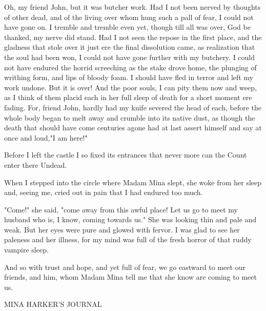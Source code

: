 Oh, my friend John, but it was butcher work. Had I not been nerved by thoughts of other dead, and of the living over whom hung such a pall of fear, I could not have gone on. I tremble and tremble even yet, though till all was over, God be thanked, my nerve did stand. Had I not seen the repose in the first place, and the gladness that stole over it just ere the final dissolution came, as realization that the soul had been won, I could not have gone further with my butchery. I could not have endured the horrid screeching as the stake drove home, the plunging of writhing form, and lips of bloody foam. I should have fled in terror and left my work undone. But it is over! And the poor souls, I can pity them now and weep, as I think of them placid each in her full sleep of death for a short moment ere fading. For, friend John, hardly had my knife severed the head of each, before the whole body began to melt away and crumble into its native dust, as though the death that should have come centuries agone had at last assert himself and say at once and loud,"I am here!" 

Before I left the castle I so fixed its entrances that never more can the Count enter there Undead. 

When I stepped into the circle where Madam Mina slept, she woke from her sleep and, seeing me, cried out in pain that I had endured too much. 

"Come!" she said, "come away from this awful place! Let us go to meet my husband who is, I know, coming towards us." She was looking thin and pale and weak. But her eyes were pure and glowed with fervor. I was glad to see her paleness and her illness, for my mind was full of the fresh horror of that ruddy vampire sleep. 

And so with trust and hope, and yet full of fear, we go eastward to meet our friends, and him, whom Madam Mina tell me that she know are coming to meet us. 

MINA HARKER'S JOURNAL 

